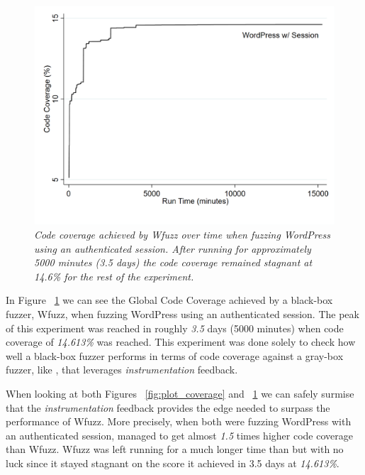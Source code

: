 \begin{figure}[!htb]
  \centering \includegraphics[width=\linewidth]{figures/plot_coverage2.pdf}
  \captionsetup{justification=centering} 
  \caption[Accumulated global code coverage using Wfuzz]{\textit{Code coverage achieved by Wfuzz over time when fuzzing WordPress using an authenticated session. After running for approximately 5000 minutes (3.5 days) the code coverage remained stagnant at 14.6\% for the rest of the experiment.}}
  \label{fig:plot_coverage2}
\end{figure}

In Figure ~\ref{fig:plot_coverage2} we can see the Global Code Coverage achieved by a black-box fuzzer, Wfuzz, when fuzzing WordPress using an authenticated session. The peak of this experiment was reached in roughly \emph{3.5} days (5000 minutes) when code coverage of \emph{14.613\%} was reached. This experiment was done solely to check how well a black-box fuzzer performs in terms of code coverage against a gray-box fuzzer, like \pname{}, that leverages \emph{instrumentation} feedback. 

When looking at both Figures ~\ref{fig:plot_coverage} and ~\ref{fig:plot_coverage2} we can safely surmise that the \emph{instrumentation} feedback provides \pname{} the edge needed to surpass the performance of Wfuzz. More precisely, when both were fuzzing WordPress with an authenticated session, \pname{} managed to get almost \emph{1.5} times higher code coverage than Wfuzz. Wfuzz was left running for a much longer time than \pname{} but with no luck since it stayed stagnant on the score it achieved in 3.5 days at \emph{14.613\%}.

